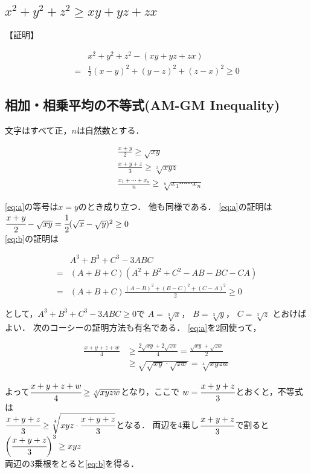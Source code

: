 \documentclass[autodetect-engine,ja=standard, 10.5pt, a4paper, titlepage]{bxjsarticle}
\numberwithin{equation}{section} %
\begin{document}
\subsection{$x^2 + y^2 + z^2 \geq xy + yz + zx$}
【証明】
\begin{fleqn}[20pt]
  \begin{align*}
    & x^2 + y^2 + z^2 - (xy + yz + zx)\\
    =& \frac{1}{2} {(x-y)^2 + (y-z)^2 + (z-x)^2} \geq 0
  \end{align*}
\end{fleqn}


\subsection{相加・相乗平均の不等式(AM-GM Inequality)}
文字はすべて正，$n$は自然数とする．\\
\begin{fleqn}[20pt]
  \begin{align*}
    &\frac{x+y}{2} \geq \sqrt{xy} \tag*{(A)}\label{eq:a}\\
    &\frac{x+y+z}{3} \geq \sqrt[3]{xyz} \tag*{(B)}\label{eq:b}\\
    &\frac{x_{1}+ \cdots +x_{n}}{n} \geq \sqrt[n]{x_{1}\cdots\cdots x_{n}}
  \end{align*}
\end{fleqn}
\ref*{eq:a}の等号は$x=y$のとき成り立つ．
他も同様である．
\ref*{eq:a}の証明は\\
$\cfrac{x+y}{2} - \sqrt{xy} = \cfrac{1}{2}(\sqrt{x}-\sqrt{y})^2 \geq 0$\\
\ref*{eq:b}の証明は
\begin{fleqn}[20pt]
  \begin{align*}
    &A^3+B^3+C^3-3ABC\\
    =&(A+B+C)(A^2+B^2+C^2-AB-BC-CA)\\
    =&(A+B+C)\frac{(A-B)^2 + (B-C)^2 + (C-A)^2}{2}\geq 0
  \end{align*}
\end{fleqn}
として，$A^3+B^3+C^3-3ABC\geq 0$で
$A=\sqrt[3]{x}$，
$B=\sqrt[3]{y}$，
$C=\sqrt[3]{z}$
とおけばよい．
次のコーシーの証明方法も有名である．
\ref*{eq:a}を2回使って，
\begin{fleqn}[20pt]
  \begin{align*}
    \frac{x+y+z+w}{4}
    &\geq \frac{2\sqrt{xy}+2\sqrt{zw}}{4} = \frac{\sqrt{xy}+\sqrt{zw}}{2}\\
    &\geq \sqrt{\sqrt{xy}\cdot \sqrt{zw}}=\sqrt[4]{xyzw}
  \end{align*}
\end{fleqn}
よって$\cfrac{x+y+z+w}{4}\geq \sqrt[4]{xyzw}$となり，ここで
$w=\cfrac{x+y+z}{3}$とおくと，不等式は\\
\hspace*{5pt}
$\cfrac{x+y+z}{3}\geq \sqrt[4]{xyz\cdot \cfrac{x+y+z}{3}}$となる．
両辺を4乗し$\cfrac{x+y+z}{3}$で割ると
$\biggl(\cfrac{x+y+z}{3}\biggr)^3\geq xyz$\\
両辺の3乗根をとると\ref*{eq:b}を得る．
\end{document}
